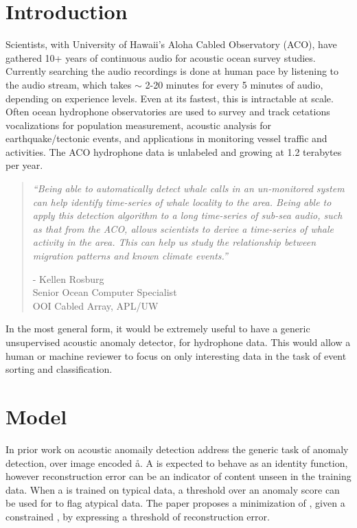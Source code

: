 \documentclass{article}
\begin{document}
\begin{multicols}{2}
\section{Introduction}

Scientists, with University of Hawaii's Aloha Cabled Observatory (ACO),
have gathered 10+ years of continuous audio for acoustic ocean survey studies.
Currently searching the audio recordings is done at human pace by listening
to the audio stream, which takes $\sim$ 2-20 minutes for every 5 minutes of
audio, depending on experience levels. Even at its fastest, this is intractable
at scale. Often ocean hydrophone observatories are used to survey and track
cetations vocalizations for population measurement, acoustic analysis for
earthquake/tectonic events, and applications in monitoring vessel traffic
and activities.
The ACO hydrophone data is unlabeled and growing at 1.2 terabytes per year.

\begin{quote}
{\small{\em ``Being able to automatically detect whale calls in an un-monitored system can help
identify time-series of whale locality to the area. Being able to apply this
detection algorithm to a long time-series of sub-sea audio, such as that from
the ACO, allows scientists to derive a time-series of whale activity in the
area. This can help us study the relationship between migration patterns and
known climate events.''}

- Kellen Rosburg\\Senior Ocean Computer Specialist\\OOI Cabled Array, APL/UW}
\end{quote}

In the most general form, it would be extremely useful to have a generic unsupervised
acoustic anomaly detector, for hydrophone data. This would allow a human or machine
reviewer to focus on only interesting data in the task of event sorting and classification.

\section{Model}

In prior work on acoustic anomaily detection\cite{1810.09133}
address the generic task of
anomaly detection, over image encoded \aa.
A \vae is expected to behave as an identity function, however reconstruction error can
be an indicator of content unseen in the training data.
When a \vae is trained on typical data, a threshold over an anomaly score can be used
for to flag atypical data. The paper proposes a minimization of \fpr, given a constrained
\tpr, by expressing a threshold of reconstruction error.


\end{multicols}
\end{document}
